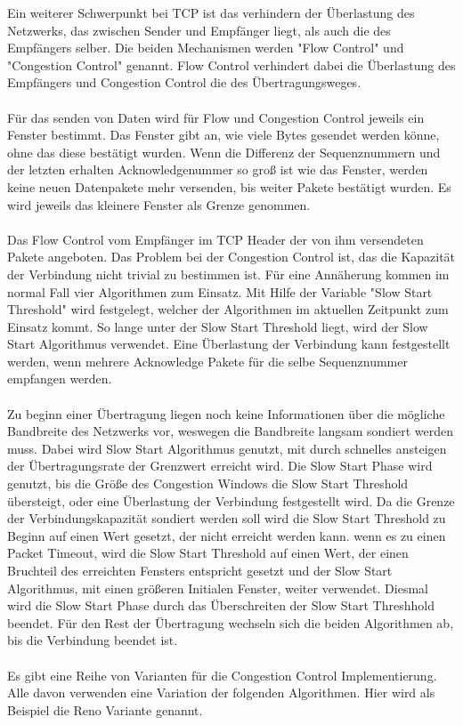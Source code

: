 Ein weiterer Schwerpunkt bei TCP ist das verhindern der Überlastung des Netzwerks, das zwischen Sender und Empfänger liegt, als auch die des Empfängers selber. 
Die beiden Mechanismen werden "Flow Control" und "Congestion Control" genannt. 
Flow Control verhindert dabei die Überlastung des Empfängers und Congestion Control die des Übertragungsweges. \\\\
Für das senden von Daten wird für Flow und Congestion Control jeweils ein Fenster bestimmt. Das Fenster gibt an, wie viele Bytes gesendet werden könne, ohne das diese bestätigt wurden. Wenn die Differenz der Sequenznummern und der letzten erhalten Acknowledgenummer so groß ist wie das Fenster, werden keine neuen Datenpakete mehr versenden, bis weiter Pakete bestätigt wurden. Es wird jeweils das kleinere Fenster als Grenze genommen. \\\\
Das Flow Control vom Empfänger im TCP Header der von ihm versendeten Pakete angeboten. 
Das Problem bei der Congestion Control ist, das die Kapazität der Verbindung nicht trivial zu bestimmen ist. Für eine Annäherung kommen im normal Fall vier Algorithmen zum Einsatz. Mit Hilfe der Variable "Slow Start Threshold" wird festgelegt, welcher der Algorithmen im aktuellen Zeitpunkt zum Einsatz kommt. So lange unter der Slow Start Threshold liegt, wird der Slow Start Algorithmus verwendet. Eine Überlastung der Verbindung kann festgestellt werden, wenn mehrere Acknowledge Pakete für die selbe Sequenznummer empfangen werden.\\\\
Zu beginn einer Übertragung liegen noch keine Informationen über die mögliche Bandbreite des Netzwerks vor, weswegen die Bandbreite langsam sondiert werden muss. Dabei wird Slow Start Algorithmus genutzt, mit durch schnelles ansteigen der Übertragungsrate der Grenzwert erreicht wird. Die Slow Start Phase wird genutzt, bis die Größe des Congestion Windows die Slow Start Threshold übersteigt, oder eine Überlastung der Verbindung festgestellt wird. Da die Grenze der Verbindungskapazität sondiert werden soll wird die Slow Start Threshold zu Beginn auf einen Wert gesetzt, der nicht erreicht werden kann. wenn es zu einen Packet Timeout, wird die Slow Start Threshold auf einen Wert, der einen Bruchteil des erreichten Fensters entspricht gesetzt und der Slow Start Algorithmus, mit einen größeren Initialen Fenster, weiter verwendet. Diesmal wird die Slow Start Phase durch das Überschreiten der Slow Start Threshhold beendet. Für den Rest der Übertragung wechseln sich die beiden Algorithmen ab, bis die Verbindung beendet ist.\\\\
Es gibt eine Reihe von Varianten für die Congestion Control Implementierung. Alle davon verwenden eine Variation der folgenden Algorithmen. Hier wird als Beispiel die Reno Variante genannt.

